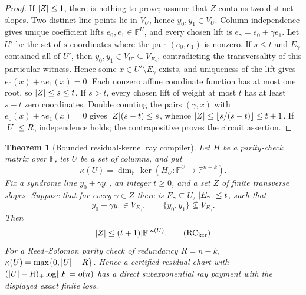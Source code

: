 \documentclass[11pt,a4paper]{amsart}
\numberwithin{equation}{section}
\newtheorem{theorem}{Theorem}[section]
\theoremstyle{remark}
\newcommand{\F}{\mathbb F}\newcommand{\B}{\mathbb B}\newcommand{\K}{\mathbb K}\newcommand{\Z}{\mathbb Z}
\begin{document}
\begin{proof}
If \(\lvert Z\rvert\le1\), there is nothing to prove; assume that \(Z\) contains
two distinct slopes.  Two distinct line points lie in \(V_U\), hence
\(y_0,y_1\in V_U\).
Column independence gives unique coefficient lifts
\(e_0,e_1\in\F^U\), and every chosen lift is
\(e_\gamma=e_0+\gamma e_1\).  Let \(U'\) be the set of \(s\) coordinates
where the pair \((e_0,e_1)\) is nonzero.  If \(s\le t\) and
\(E_\gamma\) contained all of \(U'\), then
\(y_0,y_1\in V_{U'}\subseteq V_{E_\gamma}\), contradicting the
transversality of this particular witness.  Hence some
\(x\in U'\setminus E_\gamma\) exists, and uniqueness of the lift gives
\(e_0(x)+\gamma e_1(x)=0\).  Each nonzero affine coordinate function has
at most one root, so \(\lvert Z\rvert\le s\le t\).  If \(s>t\), every chosen lift of
weight at most \(t\) has at least \(s-t\) zero coordinates.  Double
counting the pairs \((\gamma,x)\) with
\(e_0(x)+\gamma e_1(x)=0\) gives
\(\lvert Z\rvert(s-t)\le s\), whence
\(\lvert Z\rvert\le\left\lfloor s/(s-t)\right\rfloor\le t+1\).  If \(\lvert U\rvert\le R\), independence
holds; the contrapositive proves the circuit assertion.
\end{proof}

\begin{theorem}[Bounded residual-kernel ray compiler]
\label{thm:bounded-residual-kernel-ray}
Let \(H\) be a parity-check matrix over \(\F\), let \(U\) be a set of
columns, and put
\[
 \kappa(U)=\dim_\F\ker(H_U:\F^U\longrightarrow\F^{n-k}).
\]
Fix a syndrome line \(y_0+\gamma y_1\), an integer \(t\ge0\), and a set
\(Z\) of finite transverse slopes.  Suppose that for every \(\gamma\in Z\)
there is \(E_\gamma\subseteq U\), \(\lvert E_\gamma\rvert\le t\), such that
\[
 y_0+\gamma y_1\in V_{E_\gamma},\qquad
 \{y_0,y_1\}\not\subseteq V_{E_\gamma}.
\]
Then
\[
                  \abs Z\le(t+1)\abs{\F}^{\kappa(U)}. \tag{RC$_{\rm ker}$}
\]
For a Reed--Solomon parity check of redundancy \(R=n-k\),
\(\kappa(U)=\max\{0,\lvert U\rvert-R\}\).  Hence a certified residual chart with
\((\abs U-R)_+\log\abs\F=o(n)\) has a direct subexponential ray payment
with the displayed exact finite loss.
\end{theorem}
\end{document}
